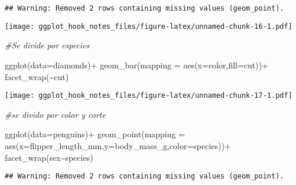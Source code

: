 \documentclass[
]{article}
\newenvironment{Shaded}{\begin{snugshade}}{\end{snugshade}}
\newcommand{\AttributeTok}[1]{\textcolor[rgb]{0.77,0.63,0.00}{#1}}
\newcommand{\CommentTok}[1]{\textcolor[rgb]{0.56,0.35,0.01}{\textit{#1}}}
\newcommand{\FunctionTok}[1]{\textcolor[rgb]{0.00,0.00,0.00}{#1}}
\newcommand{\NormalTok}[1]{#1}
\newcommand{\SpecialCharTok}[1]{\textcolor[rgb]{0.00,0.00,0.00}{#1}}
\begin{document}
\begin{verbatim}
## Warning: Removed 2 rows containing missing values (geom_point).
\end{verbatim}

\texttt{[image: ggplot\_hook\_notes\_files/figure-latex/unnamed-chunk-16-1.pdf]}

\begin{Shaded}
\begin{Highlighting}[]
\CommentTok{\#Se divide por especies}
\end{Highlighting}
\end{Shaded}

\begin{Shaded}
\begin{Highlighting}[]
\FunctionTok{ggplot}\NormalTok{(}\AttributeTok{data=}\NormalTok{diamonds)}\SpecialCharTok{+}
  \FunctionTok{geom\_bar}\NormalTok{(}\AttributeTok{mapping =} \FunctionTok{aes}\NormalTok{(}\AttributeTok{x=}\NormalTok{color,}\AttributeTok{fill=}\NormalTok{cut))}\SpecialCharTok{+}
  \FunctionTok{facet\_wrap}\NormalTok{(}\SpecialCharTok{\textasciitilde{}}\NormalTok{cut)}
\end{Highlighting}
\end{Shaded}

\texttt{[image: ggplot\_hook\_notes\_files/figure-latex/unnamed-chunk-17-1.pdf]}

\begin{Shaded}
\begin{Highlighting}[]
\CommentTok{\#se divido por color y corte}
\end{Highlighting}
\end{Shaded}

\begin{Shaded}
\begin{Highlighting}[]
\FunctionTok{ggplot}\NormalTok{(}\AttributeTok{data=}\NormalTok{penguins)}\SpecialCharTok{+}
  \FunctionTok{geom\_point}\NormalTok{(}\AttributeTok{mapping =} \FunctionTok{aes}\NormalTok{(}\AttributeTok{x=}\NormalTok{flipper\_length\_mm,}\AttributeTok{y=}\NormalTok{body\_mass\_g,}\AttributeTok{color=}\NormalTok{species))}\SpecialCharTok{+}
  \FunctionTok{facet\_wrap}\NormalTok{(sex}\SpecialCharTok{\textasciitilde{}}\NormalTok{species)}
\end{Highlighting}
\end{Shaded}

\begin{verbatim}
## Warning: Removed 2 rows containing missing values (geom_point).
\end{verbatim}
\end{document}
